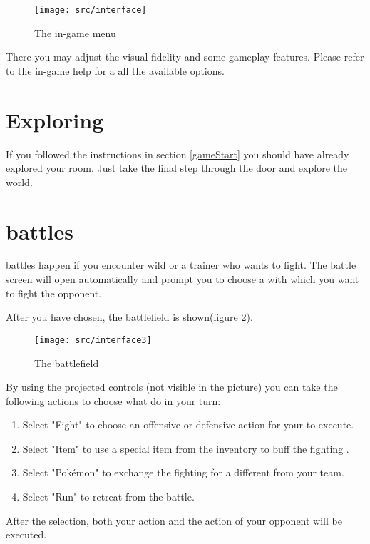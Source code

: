 \begin{figure}[!ht]
\begin{center}
\texttt{[image: src/interface]}
\end{center}
\caption{The in-game menu}
\label{game_menu}
\end{figure}

There you may adjust the visual fidelity and some gameplay features. Please refer to the in-game help for a all the available options.

\section{Exploring}

If you followed the instructions in section \ref{gameStart} you should have already explored your room. Just take the final step through the door and explore the \poke{} world.

\section[\pokeT{} battles]{\poke{} battles}
\poke{} battles happen if you encounter wild \poke{} or a \poke{} trainer who wants to fight. The battle screen will open automatically and prompt you to choose a \poke{} with which you want to fight the opponent.

After you have chosen, the battlefield is shown(figure \ref{battle}). 
\begin{figure}[!ht]
\begin{center}
\texttt{[image: src/interface3]}
\end{center}
\caption{The battlefield}
\label{battle}
\end{figure}

By using the projected controls (not visible in the picture) you can take the following actions to choose what do in your turn:
\begin{enumerate}
\item Select "Fight" to choose an offensive or defensive action for your \poke{} to execute.
\item Select "Item" to use a special item from the inventory to buff the fighting \poke{}.
\item Select "Pokémon" to exchange the fighting \poke{} for a different \poke{} from your team.
\item Select "Run" to retreat from the battle.
\end{enumerate}
After the selection, both your action and the action of your opponent will be executed.

